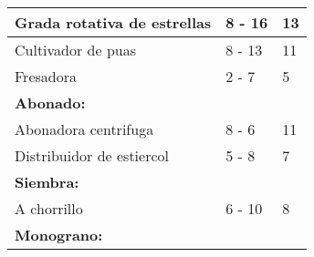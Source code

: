 \documentclass{article}
\begin{document}
\begin{table}[]
\begin{tabular}{lll}
			\multicolumn{1}{|l|}{Grada rotativa   de estrellas}   & \multicolumn{1}{l|}{8 - 16}                                                           & \multicolumn{1}{l|}{13}                                                                     \\ \hline
			\multicolumn{1}{|l|}{Cultivador de   puas}            & \multicolumn{1}{l|}{8 - 13}                                                           & \multicolumn{1}{l|}{11}                                                                     \\ \hline
			\multicolumn{1}{|l|}{Fresadora}                       & \multicolumn{1}{l|}{2 - 7}                                                            & \multicolumn{1}{l|}{5}                                                                      \\ \hline
			\multicolumn{1}{|l|}{\textbf{Abonado:}}               & \multicolumn{1}{l|}{}                                                                 & \multicolumn{1}{l|}{}                                                                       \\ \hline
			\multicolumn{1}{|l|}{Abonadora   centrifuga}          & \multicolumn{1}{l|}{8 - 6}                                                            & \multicolumn{1}{l|}{11}                                                                     \\ \hline
			\multicolumn{1}{|l|}{Distribuidor   de estiercol}     & \multicolumn{1}{l|}{5 - 8}                                                            & \multicolumn{1}{l|}{7}                                                                      \\ \hline
			\multicolumn{1}{|l|}{\textbf{Siembra:}}               & \multicolumn{1}{l|}{}                                                                 & \multicolumn{1}{l|}{}                                                                       \\ \hline
			\multicolumn{1}{|l|}{A chorrillo}                     & \multicolumn{1}{l|}{6 - 10}                                                           & \multicolumn{1}{l|}{8}                                                                      \\ \hline
			\multicolumn{1}{|l|}{\textbf{Monograno:}}             & \multicolumn{1}{l|}{}                                                                 & \multicolumn{1}{l|}{}                                                                       \\ \hline

\end{tabular}
\end{table}
\end{document}
